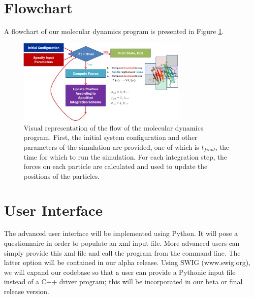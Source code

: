 \documentclass[10pt]{article}
\begin{document}

\section{Flowchart}
A flowchart of our molecular dynamics program is presented in Figure \ref{fig:flowchart}.
\begin{figure}[h]
\centering
\includegraphics[width=0.75\textwidth]{flowchart.png}
\caption{Visual representation of the flow of the molecular dynamics program. First, the initial system configuration and other parameters of the simulation are provided, one of which is $t_{final}$, the time for which to run the simulation. For each integration step, the forces on each particle are calculated and used to update the positions of the particles.}
\label{fig:flowchart}
\end{figure}

\section{User Interface}
The advanced user interface will be implemented using Python. It will pose a questionnaire in order to populate an xml input file.  More advanced users can simply provide this xml file and call the program from the command line.  The latter option will be contained in our alpha release.  Using SWIG (www.swig.org), we will expand our codebase so that a user can provide a Pythonic input file instead of a C++ driver program; this will be incorporated in our beta or final release version.
\end{document}
